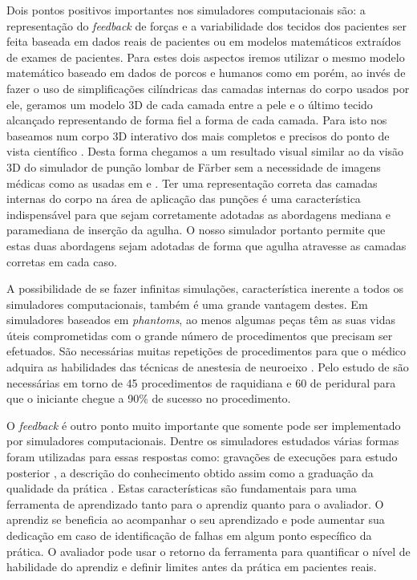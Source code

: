 Dois pontos positivos importantes nos simuladores computacionais são: a representação do \textit{feedback} de forças e a variabilidade dos tecidos dos pacientes ser feita baseada em dados reais de pacientes ou em modelos matemáticos extraídos de exames de pacientes. Para estes dois aspectos iremos utilizar o mesmo modelo matemático baseado em dados de porcos e humanos como em \textcite{Brazil2017} porém, ao invés de fazer o uso de simplificações cilíndricas das camadas internas do corpo usados por ele, geramos um modelo 3D de cada camada entre a pele e o último tecido alcançado representando de forma fiel a forma de cada camada. Para isto nos baseamos num corpo 3D interativo dos mais completos e precisos do ponto de vista científico \cite{BioDigitalInc2019}. Desta forma chegamos a um resultado visual similar ao da visão 3D do simulador de punção lombar de Färber sem a necessidade de imagens médicas como as usadas em \textcite{Farber2009} e \textcite{Dreifaldt2006}. Ter uma representação correta das camadas internas do corpo na área de aplicação das punções é uma característica indispensável para que sejam corretamente adotadas as abordagens mediana e paramediana de inserção da agulha. O nosso simulador portanto permite que estas duas abordagens sejam adotadas de forma que agulha atravesse as camadas corretas em cada caso. 

A possibilidade de se fazer infinitas simulações, característica inerente a todos os simuladores computacionais, também é uma grande vantagem destes. Em simuladores baseados em \textit{phantoms}, ao menos algumas peças têm as suas vidas úteis comprometidas com o grande número de procedimentos que precisam ser efetuados. São necessárias muitas repetições de procedimentos para que o médico adquira as habilidades das técnicas de anestesia de neuroeixo \cite{Konrad1998}. Pelo estudo de \textcite{Kopacz1996} são necessárias em torno de 45 procedimentos de raquidiana e 60 de peridural para que o iniciante chegue a 90\% de sucesso no procedimento.

O \textit{feedback} é outro ponto muito importante que somente pode ser implementado por simuladores computacionais. Dentre os simuladores estudados várias formas foram utilizadas para essas respostas como: gravações de execuções para estudo posterior \cite{Farber2009, Frazzetto2011}, a descrição do conhecimento obtido assim como a graduação da qualidade da prática \cite{Wilson2003, Albert2007, Dreifaldt2006, Brazil2017}. Estas características são fundamentais para uma ferramenta de aprendizado tanto para o aprendiz quanto para o avaliador. O aprendiz se beneficia ao acompanhar o seu aprendizado e pode aumentar sua dedicação em caso de identificação de falhas em algum ponto específico da prática. O avaliador pode usar o retorno da ferramenta para quantificar o nível de habilidade do aprendiz e definir limites antes da prática em pacientes reais. 

